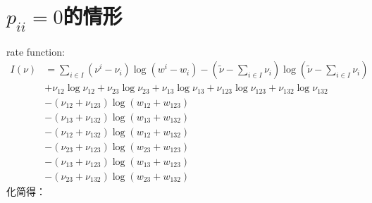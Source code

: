 \documentclass[cn,hazy,egreen,14pt,normal]{elegantnote}
\begin{document}
\section{$p_{ii}=0$的情形}
rate function:
\begin{align*}
    I(\nu)
    &= \sum_{i \in I} (\nu^{i}-\nu_{i}) \log (w^{i}-w_{i})
    - (\tilde{\nu} - \sum_{i \in I} \nu_{i}) \log (\tilde{\nu} - \sum_{i \in I} \nu_{i}) \\
    &+ \nu_{12} \log \nu_{12} + \nu_{23} \log \nu_{23} + \nu_{13} \log \nu_{13} +\nu_{123} \log \nu_{123} + \nu_{132} \log \nu_{132} \\
    &- (\nu_{12} + \nu_{123}) \log(w_{12} + w_{123}) \\
    &- (\nu_{13} + \nu_{132}) \log(w_{13} + w_{132}) \\
    &- (\nu_{12} + \nu_{132}) \log(w_{12} + w_{132}) \\
    &- (\nu_{23} + \nu_{123}) \log(w_{23} + w_{123}) \\
    &- (\nu_{13} + \nu_{123}) \log(w_{13} + w_{123}) \\
    &- (\nu_{23} + \nu_{132}) \log(w_{23} + w_{132}) 
\end{align*}
化简得：
\end{document}
